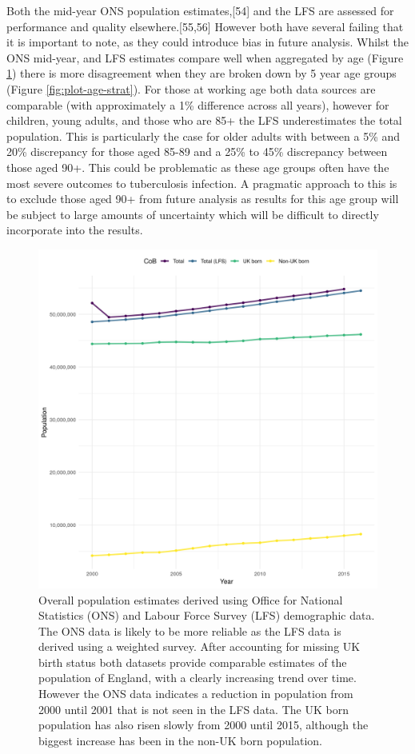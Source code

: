 \documentclass[11pt,twoside]{bristolthesis}
\begin{document}
  Both the mid-year ONS population estimates,{[}54{]} and the LFS are assessed for performance and quality elsewhere.{[}55,56{]} However both have several failing that it is important to note, as they could introduce bias in future analysis. Whilst the ONS mid-year, and LFS estimates compare well when aggregated by age (Figure \ref{fig:plot-overall-pop}) there is more disagreement when they are broken down by 5 year age groups (Figure \ref{fig:plot-age-strat}). For those at working age both data sources are comparable (with approximately a 1\% difference across all years), however for children, young adults, and those who are 85+ the LFS underestimates the total population. This is particularly the case for older adults with between a 5\% and 20\% discrepancy for those aged 85-89 and a 25\% to 45\% discrepancy between those aged 90+. This could be problematic as these age groups often have the most severe outcomes to tuberculosis infection. A pragmatic approach to this is to exclude those aged 90+ from future analysis as results for this age group will be subject to large amounts of uncertainty which will be difficult to directly incorporate into the results.
  \begin{figure}
  
  {\centering \includegraphics[width=0.8\linewidth]{chapters/tb-epi-england/figures/plot-overall-pop} 
  
  }
  
  \caption{Overall population estimates derived using Office for National Statistics (ONS) and Labour Force Survey (LFS) demographic data. The ONS data is likely to be more reliable as the LFS data is derived using a weighted survey. After accounting for missing UK birth status both datasets provide comparable estimates of the population of England, with a clearly increasing trend over time. However the ONS data indicates a reduction in population from 2000 until 2001 that is not seen in the LFS data. The UK born population has also risen slowly from 2000 until 2015, although the biggest increase has been in the non-UK born population.}\label{fig:plot-overall-pop}
  \end{figure}
\end{document}

